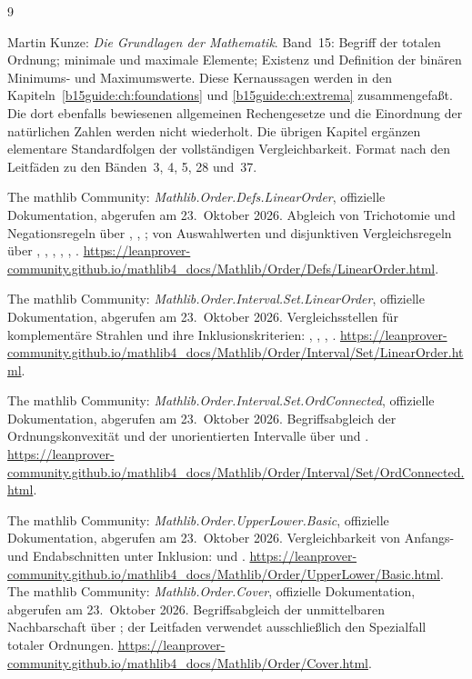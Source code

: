 \renewcommand{\bibname}{Quellen und Bandzuordnung}
\begin{thebibliography}{9}
\footnotesize
\setlength{\itemsep}{6pt}
\setlength{\parskip}{0pt}

Martin Kunze: \emph{Die Grundlagen der Mathematik}.
Band~15: Begriff der totalen Ordnung; minimale und maximale
Elemente; Existenz und Definition der binären Minimums-
und Maximumswerte. Diese Kernaussagen werden in den
Kapiteln~\ref{b15guide:ch:foundations} und
\ref{b15guide:ch:extrema} zusammengefaßt.
Die dort ebenfalls bewiesenen allgemeinen Rechengesetze
und die Einordnung der natürlichen Zahlen werden nicht wiederholt.
Die übrigen Kapitel ergänzen elementare Standardfolgen der
vollständigen Vergleichbarkeit.
Format nach den Leitfäden zu den Bänden~3, 4, 5, 28 und~37.

The mathlib Community: \emph{Mathlib.Order.Defs.LinearOrder},
offizielle Dokumentation, abgerufen am 23.~Oktober 2026.
Abgleich von Trichotomie und Negationsregeln über
, , ;
von Auswahlwerten und disjunktiven Vergleichsregeln über
, , ,
, , .
\url{https://leanprover-community.github.io/mathlib4_docs/Mathlib/Order/Defs/LinearOrder.html}.

The mathlib Community: \emph{Mathlib.Order.Interval.Set.LinearOrder},
offizielle Dokumentation, abgerufen am 23.~Oktober 2026.
Vergleichsstellen für komplementäre Strahlen und ihre Inklusionskriterien:
, ,
, .
\url{https://leanprover-community.github.io/mathlib4_docs/Mathlib/Order/Interval/Set/LinearOrder.html}.

The mathlib Community: \emph{Mathlib.Order.Interval.Set.OrdConnected},
offizielle Dokumentation, abgerufen am 23.~Oktober 2026.
Begriffsabgleich der Ordnungskonvexität und der unorientierten
Intervalle über  und
.
\url{https://leanprover-community.github.io/mathlib4_docs/Mathlib/Order/Interval/Set/OrdConnected.html}.

The mathlib Community: \emph{Mathlib.Order.UpperLower.Basic},
offizielle Dokumentation, abgerufen am 23.~Oktober 2026.
Vergleichbarkeit von Anfangs- und Endabschnitten unter Inklusion:
 und .
\url{https://leanprover-community.github.io/mathlib4_docs/Mathlib/Order/UpperLower/Basic.html}.
The mathlib Community: \emph{Mathlib.Order.Cover},
offizielle Dokumentation, abgerufen am 23.~Oktober 2026.
Begriffsabgleich der unmittelbaren Nachbarschaft über ;
der Leitfaden verwendet ausschließlich den Spezialfall totaler Ordnungen.
\url{https://leanprover-community.github.io/mathlib4_docs/Mathlib/Order/Cover.html}.


\end{thebibliography}
